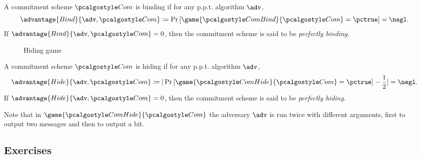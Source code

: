 \begin{definition}[Binding]
  A commitment scheme $\algo{Com}$ is binding if for any p.p.t. algorithm $\adv$,
 \[
  \advantage{Bind}{\adv, \algo{Com}} \defeq \pr{\game{\algo{ComBind}}{\algo{Com}} = \pctrue} = \negl.
 \]
 If $\advantage{Bind}{\adv, \algo{Com}} = 0$, then the commitment scheme is said to be \emph{perfectly binding}.
\end{definition}

\begin{figure}[tbhp]
  \begin{center}
    \begin{tcolorbox}[width=8cm]
      \begin{pchstack}[center]
      \end{pchstack}
    \end{tcolorbox}
  \end{center}
  \caption{Hiding game \label{fig:break-com-hid}}
\end{figure}

\begin{definition}[Hiding]
  A commitment scheme $\algo{Com}$ is hiding if for any p.p.t. algorithm $\adv$,
 \[
  \advantage{Hide}{\adv, \algo{Com}} \defeq |\pr{\game{\algo{ComHide}}{\algo{Com}} = \pctrue} - \frac{1}{2}| = \negl.
 \]
 If $\advantage{Hide}{\adv, \algo{Com}} = 0$, then the commitment scheme is said to be \emph{perfectly hiding}.
\end{definition}

Note that in $\game{\algo{ComHide}}{\algo{Com}}$ the adversary $\adv$ is run twice with different arguments, first to output two messages and then to output a bit.

\subsection{Exercises}

